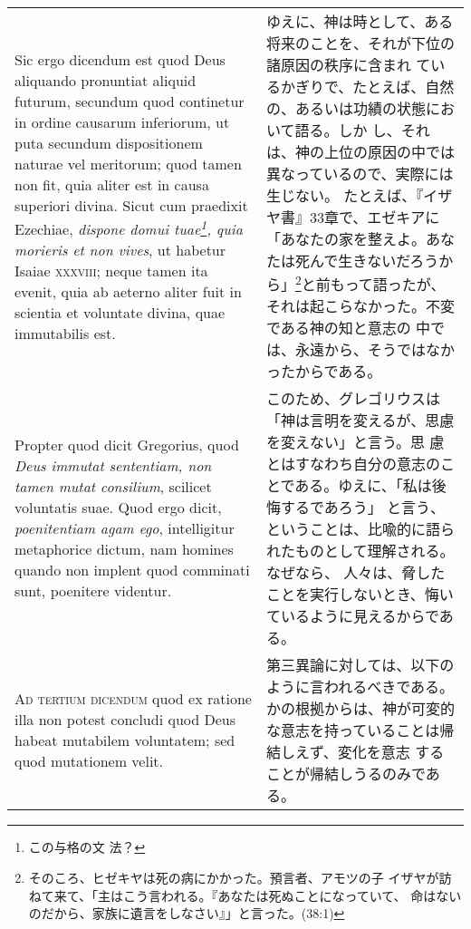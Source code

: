 \documentclass[10pt]{jsarticle} %
\begin{document}
\begin{longtable}{p{21em}p{21em}}
\\


Sic ergo dicendum est quod Deus aliquando
 pronuntiat aliquid futurum, secundum quod continetur in ordine causarum
 inferiorum, ut puta secundum dispositionem naturae vel meritorum; quod
 tamen non fit, quia aliter est in causa superiori divina. Sicut cum
 praedixit Ezechiae, {\itshape dispone domui tuae\footnote{この与格の文
 法？}, quia morieris et non vives}, ut
 habetur Isaiae {\scshape xxxviii}; neque tamen ita evenit, quia ab aeterno aliter
 fuit in scientia et voluntate divina, quae immutabilis est. 


&

ゆえに、神は時として、ある将来のことを、それが下位の諸原因の秩序に含まれ
 ているかぎりで、たとえば、自然の、あるいは功績の状態において語る。しか
 し、それは、神の上位の原因の中では異なっているので、実際には生じない。
たとえば、『イザヤ書』33章で、エゼキアに「あなたの家を整えよ。あなたは死んで生きないだろうか
 ら」\footnote{そのころ、ヒゼキヤは死の病にかかった。預言者、アモツの子
 イザヤが訪ねて来て、「主はこう言われる。『あなたは死ぬことになっていて、
 命はないのだから、家族に遺言をしなさい』」と言った。(38:1)}と前もって語ったが、それは起こらなかった。不変である神の知と意志の
 中では、永遠から、そうではなかったからである。


\\


Propter
 quod dicit Gregorius, quod {\itshape Deus immutat sententiam, non tamen mutat
 consilium}, scilicet voluntatis suae. Quod ergo dicit, {\itshape poenitentiam agam
 ego}, intelligitur metaphorice dictum, nam homines quando non implent
 quod comminati sunt, poenitere videntur.


&

このため、グレゴリウスは「神は言明を変えるが、思慮を変えない」と言う。思
 慮とはすなわち自分の意志のことである。ゆえに、「私は後悔するであろう」
 と言う、ということは、比喩的に語られたものとして理解される。なぜなら、
 人々は、脅したことを実行しないとき、悔いているように見えるからである。


\\



{\scshape Ad tertium dicendum} quod ex ratione illa non
 potest concludi quod Deus habeat mutabilem voluntatem; sed quod
 mutationem velit.


&

第三異論に対しては、以下のように言われるべきである。
かの根拠からは、神が可変的な意志を持っていることは帰結しえず、変化を意志
 することが帰結しうるのみである。



\end{longtable}
\end{document}
